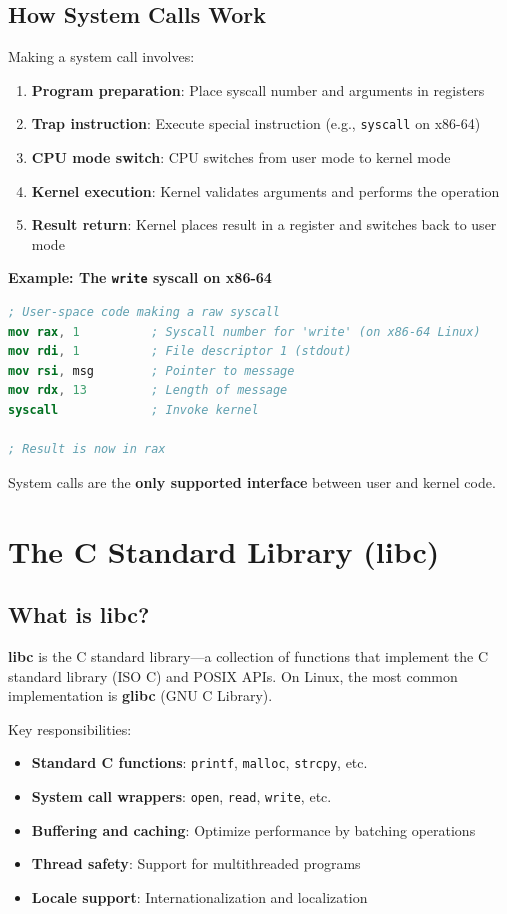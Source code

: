 \subsection{How System Calls Work}

Making a system call involves:

\begin{enumerate}
    \item \textbf{Program preparation}: Place syscall number and arguments in registers
    \item \textbf{Trap instruction}: Execute special instruction (e.g., \texttt{syscall} on x86-64)
    \item \textbf{CPU mode switch}: CPU switches from user mode to kernel mode
    \item \textbf{Kernel execution}: Kernel validates arguments and performs the operation
    \item \textbf{Result return}: Kernel places result in a register and switches back to user mode
\end{enumerate}

\textbf{Example: The \texttt{write} syscall on x86-64}

\begin{lstlisting}[language=nasm]
; User-space code making a raw syscall
mov rax, 1          ; Syscall number for 'write' (on x86-64 Linux)
mov rdi, 1          ; File descriptor 1 (stdout)
mov rsi, msg        ; Pointer to message
mov rdx, 13         ; Length of message
syscall             ; Invoke kernel

; Result is now in rax
\end{lstlisting}

System calls are the \textbf{only supported interface} between user and kernel code.

\section{The C Standard Library (libc)}

\subsection{What is libc?}

\textbf{libc} is the C standard library—a collection of functions that implement the C standard library (ISO C) and POSIX APIs. On Linux, the most common implementation is \textbf{glibc} (GNU C Library).

Key responsibilities:
\begin{itemize}
    \item \textbf{Standard C functions}: \texttt{printf}, \texttt{malloc}, \texttt{strcpy}, etc.
    \item \textbf{System call wrappers}: \texttt{open}, \texttt{read}, \texttt{write}, etc.
    \item \textbf{Buffering and caching}: Optimize performance by batching operations
    \item \textbf{Thread safety}: Support for multithreaded programs
    \item \textbf{Locale support}: Internationalization and localization
\end{itemize}

